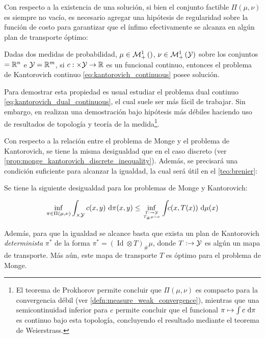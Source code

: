 Con respecto a la existencia de una solución, si bien el conjunto factible $\Pi(\mu,\nu)$ es siempre no vacío, es necesario agregar una hipótesis de regularidad sobre la función de costo para garantizar que el ínfimo efectivamente se alcanza en algún plan de transporte óptimo:

\begin{prop}
	Dadas dos medidas de probabilidad, $\mu\in\mathcal{M}_+^1\left(\right)$, $\nu\in\mathcal{M}_+^1\left(\mathcal{Y}\right)$ sobre los conjuntos $=\mathbb{R}^n$ e $\mathcal{Y}=\mathbb{R}^m$, si $c:\times\mathcal{Y}\to\mathbb{R}$ es un funcional continuo, entonces el problema de Kantorovich continuo \eqref{eq:kantorovich_continuous} posee solución.
\end{prop}

Para demostrar esta propiedad es usual estudiar el problema dual continuo \eqref{eq:kantorovich_dual_continuous}, el cual suele ser más fácil de trabajar. Sin embargo, en \cite{villani2003topics} realizan una demostración bajo hipótesis más débiles haciendo uso de resultados de topología y teoría de la medida\footnote{El teorema de Prokhorov permite concluir que $\Pi(\mu,\nu)$ es compacto para la convergencia débil (ver \autoref{defn:measure_weak_convergence}), mientras que una semicontinuidad inferior para $c$ permite concluir que el funcional $\pi\mapsto \int c\,\operatorname{d}\!\pi$ es continuo bajo esta topología, concluyendo el resultado mediante el teorema de Weierstrass.}.

Con respecto a la relación entre el problema de Monge y el problema de Kantorovich, se tiene la misma desigualdad que en el caso discreto (ver \autoref{prop:monge_kantorovich_discrete_inequality}). Además, se precisará una condición suficiente para alcanzar la igualdad, la cual será útil en el \autoref{teo:brenier}:

\begin{prop}
	\label{prop:monge_kantorovich_ineq_continuous}
	Se tiene la siguiente desigualdad para los problemas de Monge y Kantorovich:

	\begin{equation*}
		\inf_{\pi \in \Pi(\mu,\nu)} \int_{\xspace\times\yspace} c(x, y) \d\pi(x, y) \leq
		\inf_{\feasible{T:\xspace\to\yspace}{T_\#\mu=\nu}}
		\int_{\xspace} c(x, T(x)) \d\mu(x)
	\end{equation*}

	Además, para que la igualdad se alcance basta que exista un plan de Kantorovich \textit{determinista} $\pi^*$ de la forma $\pi^* = (\operatorname{Id}\otimes T)_\#\mu$, donde $T:\to\mathcal{Y}$ es algún un mapa de transporte. Más aún, este mapa de transporte $T$ es óptimo para el problema de Monge.
\end{prop}

